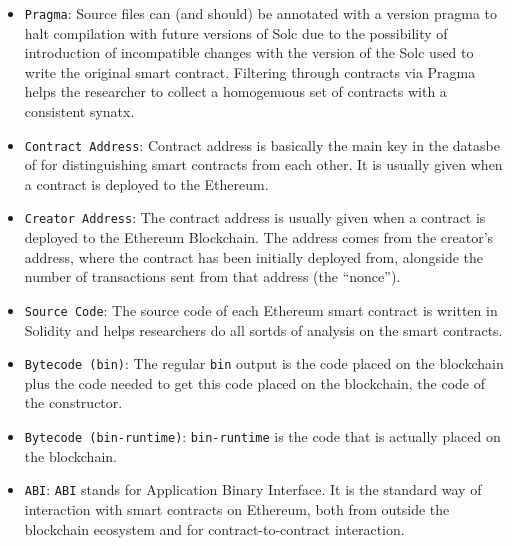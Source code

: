 	\begin{itemize}

		\item{\verb|Pragma|: Source files can (and should) be annotated with a version pragma to halt compilation with future versions of Solc due to the possibility of introduction of incompatible changes with the version of the Solc used to write the original smart contract. Filtering through contracts via Pragma helps the researcher to collect a homogenuous set of contracts with a consistent synatx.}\\

		\item{\verb|Contract Address|: Contract address is basically the main key in the datasbe of \etherbase for distinguishing smart contracts from each other.
		It is usually given when a contract is deployed to the Ethereum.}\\

		\item{\verb|Creator Address|: The contract address is usually given when a contract is deployed to the Ethereum Blockchain.
		The address comes from the creator's address, where the contract has been initially deployed from, alongside the number of transactions sent from that address (the “nonce”).~\cite{ethdocs}}\\

		\item{\verb|Source Code|: The source code of each Ethereum smart contract is written in Solidity and helps researchers do all sortds of analysis on the smart contracts.}\\

		\item{\verb|Bytecode (bin)|: The regular \verb|bin| output is the code placed on the blockchain plus the code needed to get this code placed on the blockchain, the code of the constructor.}\\

		\item{\verb|Bytecode (bin-runtime)|: \verb|bin-runtime| is the code that is actually placed on the blockchain.}\\

		\item{\verb|ABI|: \verb|ABI| stands for Application Binary Interface.
		It is the standard way of interaction with smart contracts on Ethereum,
		both from outside the blockchain ecosystem and for contract-to-contract interaction.~\cite{soliditydocs}}\\


\end{itemize}
